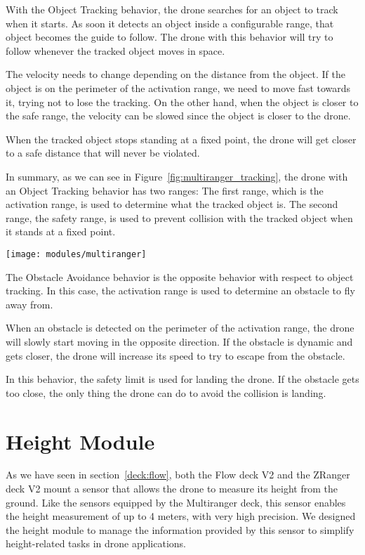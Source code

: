 With the Object Tracking behavior, the drone searches for an object to track when it starts. 
As soon it detects an object inside a configurable range, that object becomes the guide to follow. 
The drone with this behavior will try to follow whenever the tracked object moves in space. 

The velocity needs to change depending on the distance from the object. 
If the object is on the perimeter of the activation range, we need to move fast towards it, trying not to lose the tracking. 
On the other hand, when the object is closer to the safe range, the velocity can be slowed since the object is closer to the drone.

When the tracked object stops standing at a fixed point, the drone will get closer to a safe distance that will never be violated.

In summary, as we can see in Figure~\ref{fig:multiranger_tracking}, the drone with an Object Tracking behavior has two ranges:
The first range, which is the activation range, is used to determine what the tracked object is.
The second range, the safety range, is used to prevent collision with the tracked object when it stands at a fixed point.

\begin{SCfigure}[\sidecaptionrelwidth][h]
    \texttt{[image: modules/multiranger]}
    \caption{Multiranger Object Tracking behavior.}\label{fig:multiranger_tracking}
\end{SCfigure}

The Obstacle Avoidance behavior is the opposite behavior with respect to object tracking. 
In this case, the activation range is used to determine an obstacle to fly away from.

When an obstacle is detected on the perimeter of the activation range, the drone will slowly start moving in the opposite direction. 
If the obstacle is dynamic and gets closer, the drone will increase its speed to try to escape from the obstacle.

In this behavior, the safety limit is used for landing the drone. 
If the obstacle gets too close, the only thing the drone can do to avoid the collision is landing.

\section{Height Module}\label{sec:module_height}

As we have seen in section~\ref{deck:flow}, both the Flow deck V2 and the ZRanger deck V2 mount a sensor that allows the drone to measure its height from the ground.
Like the sensors equipped by the Multiranger deck, this sensor enables the height measurement of up to 4 meters, with very high precision.
We designed the height module to manage the information provided by this sensor to simplify height-related tasks in drone applications.

